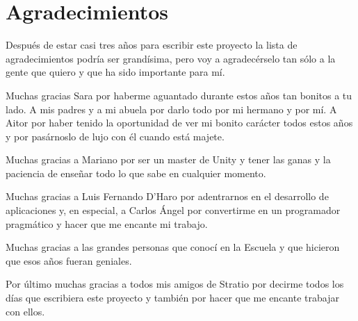\cleardoublepage
{}
\chapter*{Agradecimientos}

Después de estar casi tres años para escribir este proyecto la lista de agradecimientos podría ser grandísima, pero voy a agradecérselo tan sólo a la gente que quiero y que ha sido importante para mí.

Muchas gracias Sara por haberme aguantado durante estos años tan bonitos a tu lado. A mis padres y a mi abuela por darlo todo por mi hermano y por mí. A Aitor por haber tenido la oportunidad de ver mi bonito carácter todos estos años y por pasárnoslo de lujo con él cuando está majete.

Muchas gracias a Mariano por ser un master de Unity y tener las ganas y la paciencia de enseñar todo lo que sabe en cualquier momento.

Muchas gracias a Luis Fernando D'Haro por adentrarnos en el desarrollo de aplicaciones y, en especial, a Carlos Ángel por convertirme en un programador pragmático y hacer que me encante mi trabajo. 

Muchas gracias a las grandes personas que conocí en la Escuela y que hicieron que esos años fueran geniales.

Por último muchas gracias a todos mis amigos de Stratio por decirme todos los días que escribiera este proyecto y también por hacer que me encante trabajar con ellos.